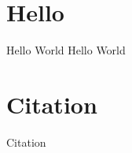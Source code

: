 \documentclass{PandaReportSlide}
\begin{document}
    \CoverPage
    
    \MetaInfo
    
    \SlideTOC
    \EnableCurrentTOC

    \section{Hello}
    \begin{frame}{Hello World}
        Hello World
    \end{frame}

    \section{Citation}
    \begin{frame}{Citation}
        \cite{latex2e} 
        \cite{texbook}
        \cite{latex:companion} 
        \cite{knuth:1984}
        \cite{lesk:1977}
        \cite{FosterEtAl:2003}
        \cite{Alsolami:2012}
        \cite{peyret2012:ch7}
    \end{frame}

    

\end{document}

